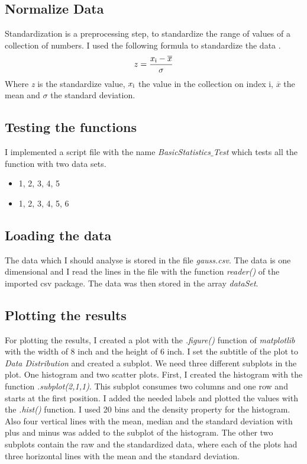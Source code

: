 \documentclass[10pt, a4paper, twocolumn]{article} %
\begin{document}
\subsection{Normalize Data}
Standardization is a preprocessing step, to standardize the range of values of a collection of numbers. I used the following formula to standardize the data
\citep{standardizeDataBuildIn}. 
\[
z = \frac{x\textsubscript{i} - \overline{x}}{\sigma}
\]
Where \textit{z} is the standardize value, \textit{$x\textsubscript{i}$} the value in the collection on index i, \textit{$\overline{x}$} the mean and \textit{$\sigma$} the standard deviation.


\subsection{Testing the functions}
I implemented a script file with the name \textit{BasicStatistics$\_$Test} which tests all the function with two data sets. 

\begin{itemize}
	\item 1, 2, 3, 4, 5
	\item 1, 2, 3, 4, 5, 6
\end{itemize}
                                                                                                                                                                                                                                                              
\subsection{Loading the data}
The data which I should analyse is stored in the file \textit{gauss.csv}. The data is one dimensional and I read the lines in the file with the function \textit{reader()} of the imported csv package. The data was then stored in the array \textit{dataSet}. 



\subsection{Plotting the results}
For plotting the results, I created a plot with the \textit{.figure()} function of \textit{matplotlib} with the width of 8 inch and the height of 6 inch. I set the subtitle of the plot to \textit{Data Distribution} and created a subplot. We need three different subplots in the plot. One histogram and two scatter plots. 
First, I created the histogram with the function  \textit{.subplot(2,1,1)}. This subplot consumes two columns and one row and starts at the first position. I added the needed labels and plotted the values with the \textit{.hist()} function. I used 20 bins and the density property for the histogram. Also four vertical lines with the mean, median and the standard deviation with plus and minus was added to the subplot of the histogram. 
The other two subplots contain the raw and the standardized data, where each of the plots had three horizontal lines with the mean and the standard deviation. 
\end{document}
